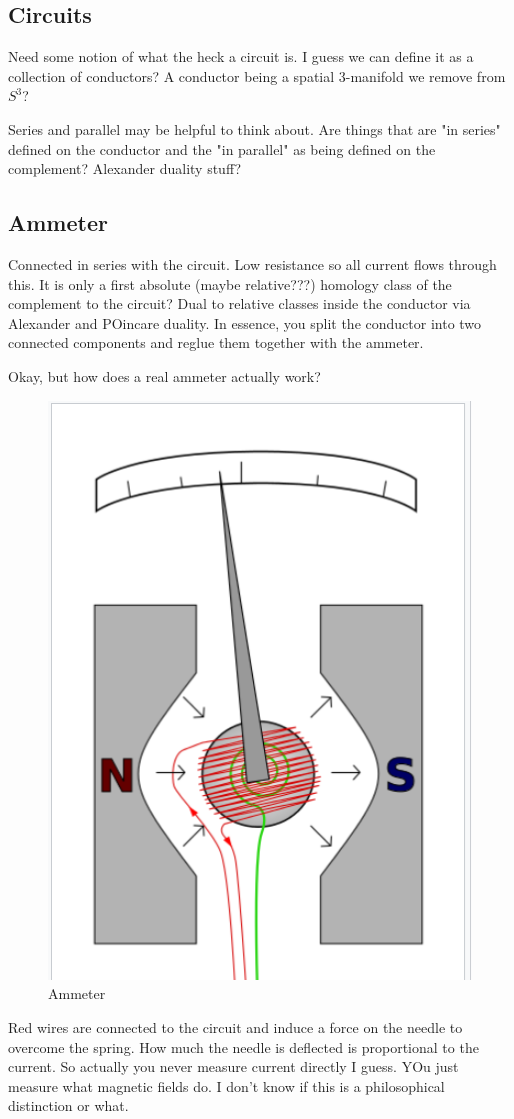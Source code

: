 \documentclass{article}
\begin{document}
\subsection{Circuits}

Need some notion of what the heck a circuit is. I guess we can define it as a collection of conductors? A conductor being a spatial 3-manifold we remove from $S^3$?

Series and parallel may be helpful to think about. Are things that are "in series" defined on the conductor and the "in parallel" as being defined on the complement? Alexander duality stuff?

\subsection{Ammeter}

Connected in series with the circuit. Low resistance so all current flows through this. It is only a first absolute (maybe relative???) homology class of the complement to the circuit? Dual to relative classes inside the conductor via Alexander and POincare duality. In essence, you split the conductor into two connected components and reglue them together with the ammeter.

Okay, but how does a real ammeter actually work? 
\begin{figure}
    \centering
    \includegraphics{figures/ammeter.png}
    \caption{Ammeter}
\end{figure}
Red wires are connected to the circuit and induce a force on the needle to overcome the spring. How much the needle is deflected is proportional to the current. So actually you never measure current directly I guess. YOu just measure what magnetic fields do. I don't know if this is a philosophical distinction or what.
\end{document}
